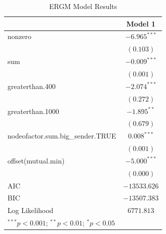 
\begin{table}
\begin{center}
\begin{tabular}{l c}
\hline
 & Model 1 \\
\hline
nonzero                          & $-6.965^{***}$ \\
                                 & $(0.103)$      \\
sum                              & $-0.009^{***}$ \\
                                 & $(0.001)$      \\
greaterthan.400                  & $-2.074^{***}$ \\
                                 & $(0.272)$      \\
greaterthan.1000                 & $-1.895^{**}$  \\
                                 & $(0.679)$      \\
nodeofactor.sum.big\_sender.TRUE & $0.008^{***}$  \\
                                 & $(0.001)$      \\
offset(mutual.min)               & $-5.000^{***}$ \\
                                 & $(0.000)$      \\
\hline
AIC                              & $-13533.626$   \\
BIC                              & $-13507.383$   \\
Log Likelihood                   & $6771.813$     \\
\hline
\multicolumn{2}{l}{\scriptsize{$^{***}p<0.001$; $^{**}p<0.01$; $^{*}p<0.05$}}
\end{tabular}
\caption{ERGM Model Results}
\label{tab:ergm}
\end{center}
\end{table}

